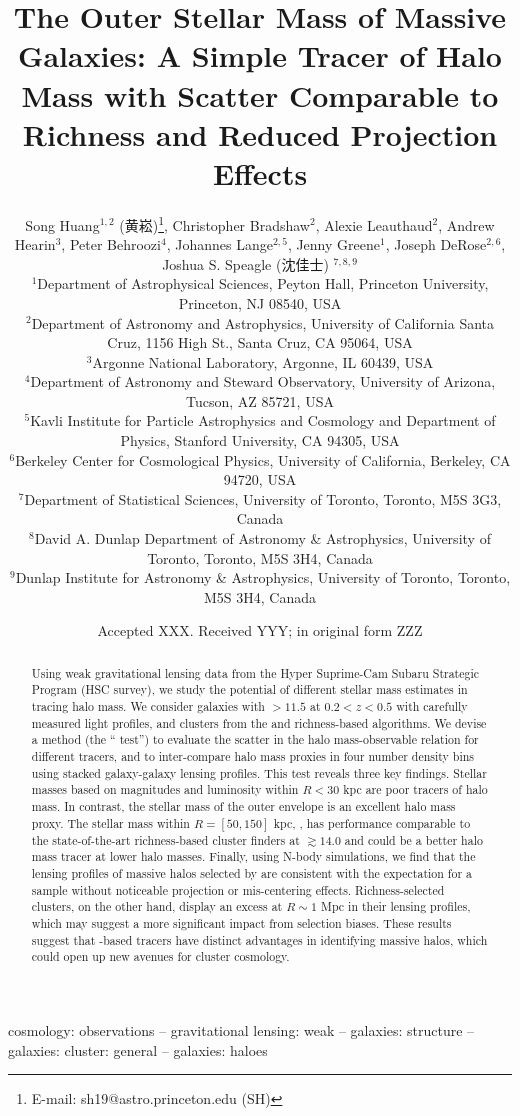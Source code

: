 \documentclass[fleqn,usenatbib,useAMS,english]{mnras}
\title[Outer Galaxy Mass as a Halo Mass Proxy]{
    The Outer Stellar Mass of Massive Galaxies: A Simple Tracer of Halo Mass with Scatter 
    Comparable to Richness and Reduced Projection Effects}
\author[S. Huang et al.]{
        Song Huang$^{1,2}$ (黄崧)\thanks{E-mail: sh19@astro.princeton.edu (SH)},
        Christopher Bradshaw$^{2}$,
        Alexie Leauthaud$^{2}$,
        \newauthor
        Andrew Hearin$^{3}$,
        Peter Behroozi$^{4}$,
        Johannes Lange$^{2, 5}$,
        Jenny Greene$^{1}$,
        \newauthor
        Joseph DeRose$^{2, 6}$,
        Joshua S. Speagle (沈佳士) $^{7, 8, 9}$\\
        $^{1}$Department of Astrophysical Sciences, Peyton Hall,
              Princeton University, Princeton, NJ 08540, USA \\
        $^{2}$Department of Astronomy and Astrophysics, University of California
              Santa Cruz, 1156 High St., Santa Cruz, CA 95064, USA\\
        $^{3}$Argonne National Laboratory, Argonne, IL 60439, USA\\
        $^{4}$Department of Astronomy and Steward Observatory, University of Arizona,
              Tucson, AZ 85721, USA\\
        $^{5}$Kavli Institute for Particle Astrophysics and Cosmology and Department of Physics, 
            Stanford University, CA 94305, USA\\
        $^{6}$Berkeley Center for Cosmological Physics, University of California, 
            Berkeley, CA 94720, USA\\
        $^{7}$Department of Statistical Sciences, University of Toronto, Toronto, M5S 3G3, Canada\\
        $^{8}$David A. Dunlap Department of Astronomy \& Astrophysics, University of Toronto, 
            Toronto, M5S 3H4, Canada\\
        $^{9}$Dunlap Institute for Astronomy \& Astrophysics, University of Toronto, 
            Toronto, M5S 3H4, Canada
        }
\date{Accepted XXX. Received YYY; in original form ZZZ}
\begin{document}
\label{firstpage}
\pagerange{\pageref{firstpage}--\pageref{lastpage}}

\maketitle


\begin{abstract}
    
    Using weak gravitational lensing data from the Hyper Suprime-Cam Subaru Strategic Program
    (HSC survey), we study the potential of different stellar mass estimates in tracing halo
    mass.
    We consider galaxies with \logms{}$>11.5$ at $0.2 < z < 0.5$ with carefully measured light 
    profiles, and clusters from the \redm{} and \camira{} richness-based algorithms.
    We devise a method (the ``\topn{} test'') to evaluate the scatter in the halo mass-observable
    relation for different tracers, and to inter-compare halo mass proxies in four number density 
    bins using stacked galaxy-galaxy lensing profiles.
    This test reveals three key findings. Stellar masses based on \cmodel{} magnitudes and 
    luminosity within $R<$30 kpc are poor tracers of halo mass. 
    In contrast, the stellar mass of the outer envelope is an excellent halo mass proxy. 
    The stellar mass within $R=[50,150]$ kpc, , has performance comparable to the
    state-of-the-art richness-based cluster finders at \logmvir{}$\gtrsim 14.0$ and could be 
    a better halo mass tracer at lower halo masses. 
    Finally, using N-body simulations, we find that the lensing profiles of massive halos selected
    by  are consistent with the expectation for a sample without noticeable 
    projection or mis-centering effects. 
    Richness-selected clusters, on the other hand, display an excess at $R\sim 1$ Mpc in their 
    lensing profiles, which may suggest a more significant impact from selection biases.
    These results suggest that \mstar{}-based tracers have distinct advantages in
    identifying massive halos, which could open up new avenues for cluster cosmology.

\end{abstract}

\begin{keywords}
    cosmology: observations --
    gravitational lensing: weak --
    galaxies: structure --
    galaxies: cluster: general --
    galaxies: haloes
\end{keywords}
\end{document}

